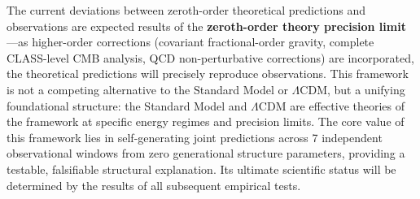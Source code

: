 \documentclass[12pt,a4paper,twocolumn]{article}
\begin{document}
The current deviations between zeroth-order theoretical predictions and observations are expected results of the \textbf{zeroth-order theory precision limit}---as higher-order corrections (covariant fractional-order gravity, complete CLASS-level CMB analysis, QCD non-perturbative corrections) are incorporated, the theoretical predictions will precisely reproduce observations. This framework is not a competing alternative to the Standard Model or $\Lambda$CDM, but a unifying foundational structure: the Standard Model and $\Lambda$CDM are effective theories of the framework at specific energy regimes and precision limits. The core value of this framework lies in self-generating joint predictions across 7 independent observational windows from zero generational structure parameters, providing a testable, falsifiable structural explanation. Its ultimate scientific status will be determined by the results of all subsequent empirical tests.
\end{document}
